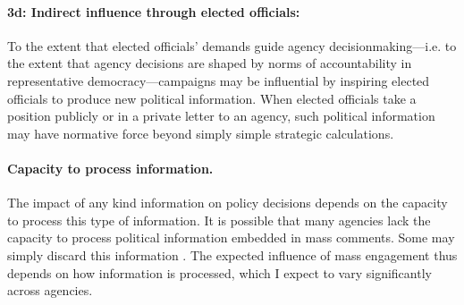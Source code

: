 \paragraph{3d: Indirect influence through elected officials:} 
To the extent that elected officials' demands guide agency decisionmaking---i.e. to the extent that agency decisions are shaped by norms of accountability in representative democracy---campaigns may be influential by inspiring elected officials to produce new political information. When elected officials take a position publicly or in a private letter to an agency, such political information may have normative force beyond simply simple strategic calculations.


\paragraph{Capacity to process information.} The impact of any kind information on policy decisions depends on the capacity to process this type of information.
It is possible that many agencies lack the capacity to process political information embedded in mass comments. Some may simply discard this information \citep{Mendelson2011}. The expected influence of mass engagement thus depends on how information is processed, which I expect to vary significantly across agencies. %






 






